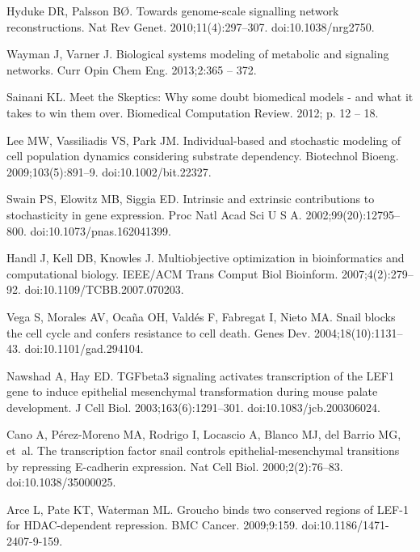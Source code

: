 \documentclass[11pt,letterpaper]{article}
\begin{document}
\begin{thebibliography}{10}
Hyduke DR, Palsson B{\O}.
\newblock Towards genome-scale signalling network reconstructions.
\newblock Nat Rev Genet. 2010;11(4):297--307.
\newblock doi:{10.1038/nrg2750}.

Wayman J, Varner J.
\newblock Biological systems modeling of metabolic and signaling networks.
\newblock Curr Opin Chem Eng. 2013;2:365 -- 372.

Sainani KL.
\newblock Meet the Skeptics: Why some doubt biomedical models - and what it
  takes to win them over.
\newblock Biomedical Computation Review. 2012; p. 12 -- 18.

Lee MW, Vassiliadis VS, Park JM.
\newblock Individual-based and stochastic modeling of cell population dynamics
  considering substrate dependency.
\newblock Biotechnol Bioeng. 2009;103(5):891--9.
\newblock doi:{10.1002/bit.22327}.

Swain PS, Elowitz MB, Siggia ED.
\newblock Intrinsic and extrinsic contributions to stochasticity in gene
  expression.
\newblock Proc Natl Acad Sci U S A. 2002;99(20):12795--800.
\newblock doi:{10.1073/pnas.162041399}.

Handl J, Kell DB, Knowles J.
\newblock Multiobjective optimization in bioinformatics and computational
  biology.
\newblock IEEE/ACM Trans Comput Biol Bioinform. 2007;4(2):279--92.
\newblock doi:{10.1109/TCBB.2007.070203}.

Vega S, Morales AV, Oca{\~n}a OH, Vald{\'e}s F, Fabregat I, Nieto MA.
\newblock Snail blocks the cell cycle and confers resistance to cell death.
\newblock Genes Dev. 2004;18(10):1131--43.
\newblock doi:{10.1101/gad.294104}.

Nawshad A, Hay ED.
\newblock TGFbeta3 signaling activates transcription of the LEF1 gene to induce
  epithelial mesenchymal transformation during mouse palate development.
\newblock J Cell Biol. 2003;163(6):1291--301.
\newblock doi:{10.1083/jcb.200306024}.

Cano A, P{\'e}rez-Moreno MA, Rodrigo I, Locascio A, Blanco MJ, del Barrio MG,
  et~al.
\newblock The transcription factor snail controls epithelial-mesenchymal
  transitions by repressing E-cadherin expression.
\newblock Nat Cell Biol. 2000;2(2):76--83.
\newblock doi:{10.1038/35000025}.

Arce L, Pate KT, Waterman ML.
\newblock Groucho binds two conserved regions of LEF-1 for HDAC-dependent
  repression.
\newblock BMC Cancer. 2009;9:159.
\newblock doi:{10.1186/1471-2407-9-159}.


\end{thebibliography}
\end{document}
